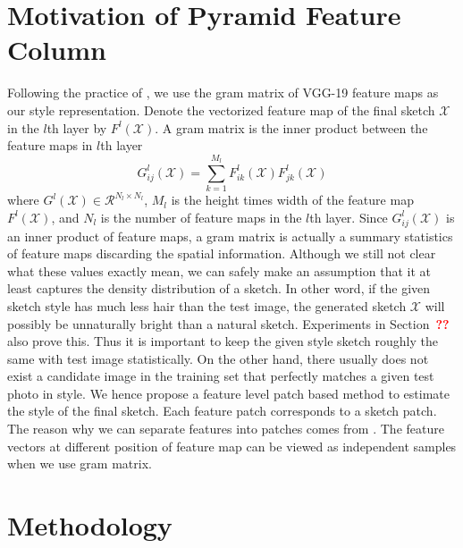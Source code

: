 \documentclass[10pt,twocolumn,letterpaper]{article}
\def\red[#1]{\textcolor{red}{\textbf{#1}}}
\begin{document}
\section{Motivation of Pyramid Feature Column}\label{sec:motivation}

Following the practice of \cite{gatys2015neural}, we use the gram matrix of VGG-19\cite{simonyan2014very} feature maps as our style representation. Denote the vectorized feature map of the final sketch $\mathcal{X}$ in the $l$th layer by $F^{l}(\mathcal{X})$. A gram matrix is the inner product between the feature maps in $l$th layer
\begin{equation}
G^l_{ij}(\mathcal{X}) = \sum \limits_{k=1}^{M_l} F^l_{ik}(\mathcal{X}) F^l_{jk}(\mathcal{X})
\label{eq:Gram_element}
\end{equation}
where $G^l(\mathcal{X}) \in {\mathcal{R}^{N_l \times N_l}}$, $M_l$ is the height times width of the feature map $F^{l}(\mathcal{X})$, and $N_l$ is the number of feature maps in the $l$th layer. Since $G^l_{ij}(\mathcal{X})$ is an inner product of feature maps, a gram matrix is actually a summary statistics of feature maps discarding the spatial information. Although we still not clear what these values exactly mean, we can safely make an assumption that it at least captures the density distribution of a sketch. In other word, if the given sketch style has much less hair than the test image, the generated sketch $\mathcal{X}$ will possibly be unnaturally bright than a natural sketch. Experiments in Section~\red[??] also prove this. 
Thus it is important to keep the given style sketch roughly the same with test image statistically. On the other hand, there usually does not exist a candidate image in the training set that perfectly matches a given test photo in style. We hence propose a feature level patch based method to estimate the style of the final sketch. Each feature patch corresponds to a sketch patch. The reason why we can separate features into patches comes from \cite{Li2017Demistify}. The feature vectors at different position of feature map can be viewed as independent samples when we use gram matrix. 

\section{Methodology}
\end{document}
